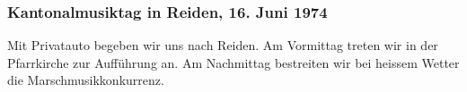 \begin{history}
    \subsubsection*{Kantonalmusiktag in Reiden, 16. Juni 1974}

    Mit Privatauto begeben wir uns nach Reiden. Am Vormittag treten wir in der
    Pfarrkirche zur Aufführung an. Am Nachmittag bestreiten wir bei heissem
    Wetter die Marschmusikkonkurrenz.


\end{history}